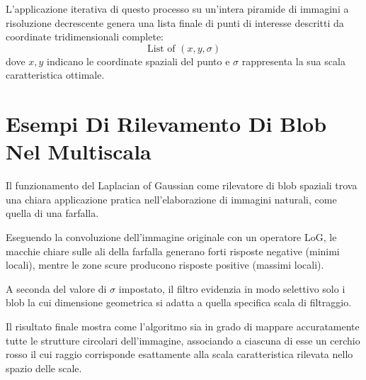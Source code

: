 ﻿\documentclass[11pt, a4paper]{article}
\begin{document}

L'applicazione iterativa di questo processo su un'intera piramide di immagini a risoluzione decrescente genera una lista finale di punti di interesse descritti da coordinate tridimensionali complete:
\[ \text{List of } (x, y, \sigma) \]
dove $x, y$ indicano le coordinate spaziali del punto e $\sigma$ rappresenta la sua scala caratteristica ottimale.

\newpage

\section{Esempi Di Rilevamento Di Blob Nel Multiscala}

Il funzionamento del Laplacian of Gaussian come rilevatore di blob spaziali trova una chiara applicazione pratica nell'elaborazione di immagini naturali, come quella di una farfalla.


Eseguendo la convoluzione dell'immagine originale con un operatore LoG, le macchie chiare sulle ali della farfalla generano forti risposte negative (minimi locali), mentre le zone scure producono risposte positive (massimi locali).



A seconda del valore di $\sigma$ impostato, il filtro evidenzia in modo selettivo solo i blob la cui dimensione geometrica si adatta a quella specifica scala di filtraggio.


Il risultato finale mostra come l'algoritmo sia in grado di mappare accuratamente tutte le strutture circolari dell'immagine, associando a ciascuna di esse un cerchio rosso il cui raggio corrisponde esattamente alla scala caratteristica rilevata nello spazio delle scale.
\end{document}
